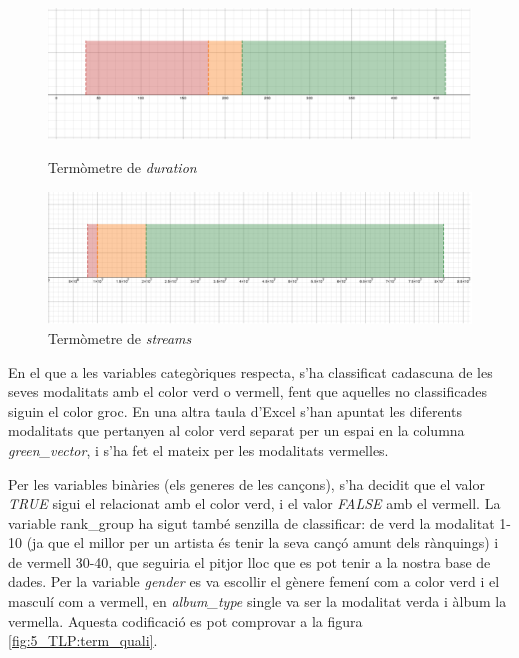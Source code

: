 \begin{figure}[H]
\centering
    \begin{minipage}{.49\textwidth}
        \centering
        \includegraphics[width=0.95\linewidth]{Images/5_TLP/duration_term.png}

        \caption{Termòmetre de \emph{duration}}
        \label{fig:5_TLP:duration}
    \end{minipage}%
    \begin{minipage}{.49\textwidth}
        \centering
        \includegraphics[width=0.95\linewidth]{Images/5_TLP/streams_term.png}
        \caption{Termòmetre de \emph{streams}}
        \label{fig:5_TLP:streams}
    \end{minipage}%
\end{figure}


En el que a les variables categòriques respecta, s'ha classificat cadascuna de les seves modalitats amb el color verd o vermell, fent que aquelles no classificades siguin el color groc. En una altra taula d'Excel s'han apuntat les diferents modalitats que pertanyen al color verd separat per un espai en la columna \textit{green\_vector}, i s'ha fet el mateix per les modalitats vermelles.

Per les variables binàries (els generes de les cançons), s'ha decidit que el valor \textit{TRUE} sigui el relacionat amb el color verd, i el valor \textit{FALSE} amb el vermell. La variable rank\_group ha sigut també senzilla de classificar: de verd la modalitat 1-10 (ja que el millor per un artista és tenir la seva cançó amunt dels rànquings) i de vermell 30-40, que seguiria el pitjor lloc que es pot tenir a la nostra base de dades. Per la variable \textit{gender} es va escollir el gènere femení com a color verd i el masculí com a vermell, en \textit{album\_type} single va ser la modalitat verda i àlbum la vermella. Aquesta codificació es pot comprovar a la figura \ref{fig:5_TLP:term_quali}.

